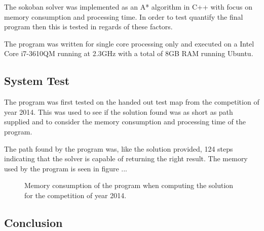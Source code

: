 The sokoban solver was implemented as an A* algorithm in C++ with focus on memory consumption and processing time.
In order to test quantify the final program then this is tested in regards of these factors.

The program was written for single core processing only and executed on a Intel Core i7-3610QM running at 2.3GHz with a total of 8GB RAM running Ubuntu.

\subsection{System Test}
The program was first tested on the handed out test map from the competition of year 2014.
This was used to see if the solution found was as short as path supplied and to consider the memory consumption and processing time of the program.

The path found by the program was, like the solution provided, 124 steps indicating that the solver is capable of returning the right result.
The memory used by the program is seen in figure ...

\begin{figure}[H]
\centering
\caption{Memory consumption of the program when computing the solution for the competition of year 2014.}
\label{fig:memoryconsumption2014}
\end{figure}



\subsection{Conclusion}


